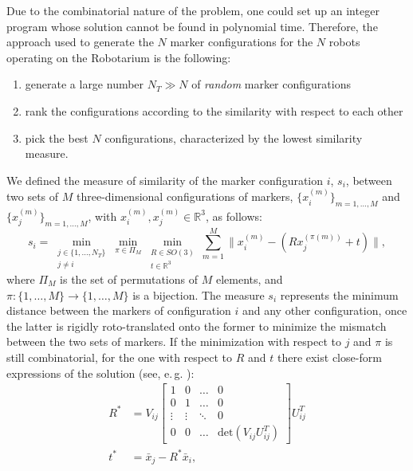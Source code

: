 \documentclass{article}
\begin{document}
Due to the combinatorial nature of the problem, one could set up an integer program whose solution cannot be found in polynomial time. Therefore, the approach used to generate the $N$ marker configurations for the $N$ robots operating on the Robotarium is the following:
\begin{enumerate}
\item generate a large number $N_T \gg N$ of \textit{random} marker configurations
\item rank the configurations according to the similarity with respect to each other
\item pick the best $N$ configurations, characterized by the lowest similarity measure.
\end{enumerate}
We defined the measure of similarity of the marker configuration $i$, $s_i$, between two sets of $M$ three-dimensional configurations of markers, $\{x_i^{(m)}\}_{m=1,\ldots,M}$ and $\{x_j^{(m)}\}_{m=1,\ldots,M}$, with $x_i^{(m)},x_j^{(m)}\in\mathbb R^3$, as follows:
\begin{equation}
s_i = \min_{\substack{j\in\{1,\ldots,N_T\}\\j\neq i}} \min_{\pi\in\Pi_M} \min_{\substack{R\in SO(3)\\t\in\mathbb R^3}} \sum_{m=1}^{M} \| x_i^{(m)} - (R x_j^{(\pi(m))} + t) \|,
\end{equation}
where $\Pi_M$ is the set of permutations of $M$ elements, and $\pi:\{1,\ldots,M\}\to\{1,\ldots,M\}$ is a bijection. The measure $s_i$ represents the minimum distance between the markers of configuration $i$ and any other configuration, once the latter is rigidly roto-translated onto the former to minimize the mismatch between the two sets of markers. If the minimization with respect to $j$ and $\pi$ is still combinatorial, for the one with respect to $R$ and $t$ there exist close-form expressions of the solution (see, e.\,g. \cite{arun1987least}):
\begin{equation}
\begin{aligned}
R^* &= V_{ij} \begin{bmatrix}
1 & 0 & \ldots & 0\\
0 & 1 & \ldots & 0\\
\vdots & \vdots & \ddots & 0\\
0 & 0 & \ldots & \textrm{det}(V_{ij}U_{ij}^T)
\end{bmatrix}U_{ij}^T\\
t^* &= \bar x_j - R^* \bar x_i,
\end{aligned}
\end{equation}
\end{document}
